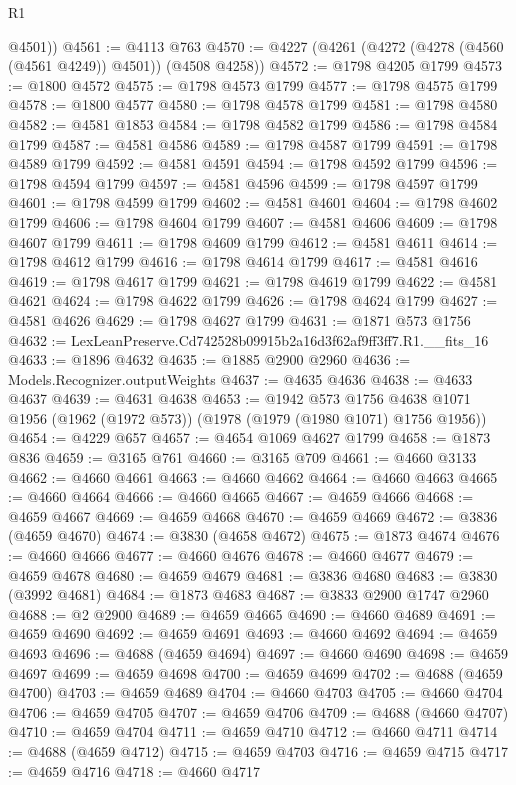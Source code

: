 \begin{lexlean}{R1}
\begin{coremodule}
        @4501))
@4561 := @4113 @763
@4570 := @4227 (@4261 (@4272 (@4278 (@4560 (@4561 @4249)) @4501)) (@4508 @4258))
@4572 := @1798 @4205 @1799
@4573 := @1800 @4572
@4575 := @1798 @4573 @1799
@4577 := @1798 @4575 @1799
@4578 := @1800 @4577
@4580 := @1798 @4578 @1799
@4581 := @1798 @4580
@4582 := @4581 @1853
@4584 := @1798 @4582 @1799
@4586 := @1798 @4584 @1799
@4587 := @4581 @4586
@4589 := @1798 @4587 @1799
@4591 := @1798 @4589 @1799
@4592 := @4581 @4591
@4594 := @1798 @4592 @1799
@4596 := @1798 @4594 @1799
@4597 := @4581 @4596
@4599 := @1798 @4597 @1799
@4601 := @1798 @4599 @1799
@4602 := @4581 @4601
@4604 := @1798 @4602 @1799
@4606 := @1798 @4604 @1799
@4607 := @4581 @4606
@4609 := @1798 @4607 @1799
@4611 := @1798 @4609 @1799
@4612 := @4581 @4611
@4614 := @1798 @4612 @1799
@4616 := @1798 @4614 @1799
@4617 := @4581 @4616
@4619 := @1798 @4617 @1799
@4621 := @1798 @4619 @1799
@4622 := @4581 @4621
@4624 := @1798 @4622 @1799
@4626 := @1798 @4624 @1799
@4627 := @4581 @4626
@4629 := @1798 @4627 @1799
@4631 := @1871 @573 @1756
@4632 := LexLeanPreserve.Cd742528b09915b2a16d3f62af9ff3ff7.R1.__fits_16
@4633 := @1896 @4632
@4635 := @1885 @2900 @2960
@4636 := Models.Recognizer.outputWeights
@4637 := @4635 @4636
@4638 := @4633 @4637
@4639 := @4631 @4638
@4653 := @1942
    @573
    @1756
    @4638
    @1071
    @1956
    (@1962 (@1972 @573))
    (@1978 (@1979 (@1980 @1071) @1756 @1956))
@4654 := @4229 @657
@4657 := @4654 @1069 @4627 @1799
@4658 := @1873 @836
@4659 := @3165 @761
@4660 := @3165 @709
@4661 := @4660 @3133
@4662 := @4660 @4661
@4663 := @4660 @4662
@4664 := @4660 @4663
@4665 := @4660 @4664
@4666 := @4660 @4665
@4667 := @4659 @4666
@4668 := @4659 @4667
@4669 := @4659 @4668
@4670 := @4659 @4669
@4672 := @3836 (@4659 @4670)
@4674 := @3830 (@4658 @4672)
@4675 := @1873 @4674
@4676 := @4660 @4666
@4677 := @4660 @4676
@4678 := @4660 @4677
@4679 := @4659 @4678
@4680 := @4659 @4679
@4681 := @3836 @4680
@4683 := @3830 (@3992 @4681)
@4684 := @1873 @4683
@4687 := @3833 @2900 @1747 @2960
@4688 := @2 @2900
@4689 := @4659 @4665
@4690 := @4660 @4689
@4691 := @4659 @4690
@4692 := @4659 @4691
@4693 := @4660 @4692
@4694 := @4659 @4693
@4696 := @4688 (@4659 @4694)
@4697 := @4660 @4690
@4698 := @4659 @4697
@4699 := @4659 @4698
@4700 := @4659 @4699
@4702 := @4688 (@4659 @4700)
@4703 := @4659 @4689
@4704 := @4660 @4703
@4705 := @4660 @4704
@4706 := @4659 @4705
@4707 := @4659 @4706
@4709 := @4688 (@4660 @4707)
@4710 := @4659 @4704
@4711 := @4659 @4710
@4712 := @4660 @4711
@4714 := @4688 (@4659 @4712)
@4715 := @4659 @4703
@4716 := @4659 @4715
@4717 := @4659 @4716
@4718 := @4660 @4717

\end{coremodule}
\end{lexlean}
